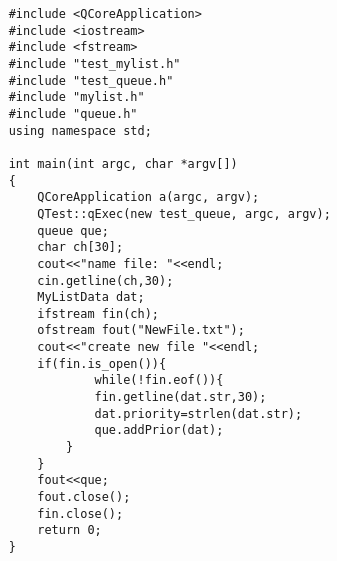 \documentclass[12pt]{report}
\begin{document}
\lstset{language=C++,style=customc}          %
\begin{lstlisting}                
	#include <QCoreApplication>
	#include <iostream>
	#include <fstream>
	#include "test_mylist.h"
	#include "test_queue.h"
	#include "mylist.h"
	#include "queue.h"
	using namespace std;
	
	int main(int argc, char *argv[])
	{
		QCoreApplication a(argc, argv);
		QTest::qExec(new test_queue, argc, argv);	
		queue que;
		char ch[30];
		cout<<"name file: "<<endl;
		cin.getline(ch,30);
		MyListData dat;
		ifstream fin(ch);
		ofstream fout("NewFile.txt");
		cout<<"create new file "<<endl;
		if(fin.is_open()){
				while(!fin.eof()){
				fin.getline(dat.str,30);
				dat.priority=strlen(dat.str);
				que.addPrior(dat);
			}
		}
		fout<<que;
		fout.close();
		fin.close();
		return 0;
	}
\end{lstlisting}                  

\printbibliography
\end{document}
